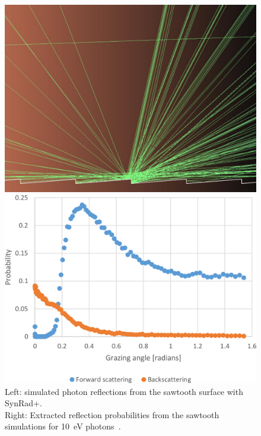 \begin{figure}[tbh]
    \centering
    \begin{minipage}[t]{0.47\textwidth}
        \includegraphics[width=\textwidth]{../ss/synrad_plus_sawtooth.png}
    \end{minipage}
    \hspace{0.5cm}
    \begin{minipage}[t]{0.47\textwidth}
        \includegraphics[width=\textwidth]{../ss/synrad_plus_sawtooth_refl.png}
    \end{minipage}
    \caption{
        Left: simulated photon reflections from the sawtooth surface with SynRad+.
        \\
        Right: Extracted reflection probabilities from the sawtooth simulations for 10~eV photons~\cite{synrad+}.
    }
    \label{fig:synrad+}
\end{figure}

